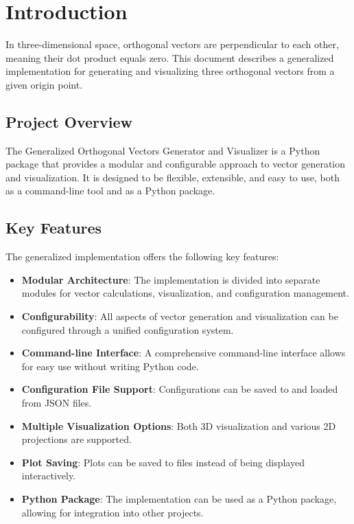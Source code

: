 \section{Introduction}

In three-dimensional space, orthogonal vectors are perpendicular to each other, meaning their dot product equals zero. This document describes a generalized implementation for generating and visualizing three orthogonal vectors from a given origin point.

\subsection{Project Overview}

The Generalized Orthogonal Vectors Generator and Visualizer is a Python package that provides a modular and configurable approach to vector generation and visualization. It is designed to be flexible, extensible, and easy to use, both as a command-line tool and as a Python package.

\subsection{Key Features}

The generalized implementation offers the following key features:

\begin{itemize}
    \item \textbf{Modular Architecture}: The implementation is divided into separate modules for vector calculations, visualization, and configuration management.
    
    \item \textbf{Configurability}: All aspects of vector generation and visualization can be configured through a unified configuration system.
    
    \item \textbf{Command-line Interface}: A comprehensive command-line interface allows for easy use without writing Python code.
    
    \item \textbf{Configuration File Support}: Configurations can be saved to and loaded from JSON files.
    
    \item \textbf{Multiple Visualization Options}: Both 3D visualization and various 2D projections are supported.
    
    \item \textbf{Plot Saving}: Plots can be saved to files instead of being displayed interactively.
    
    \item \textbf{Python Package}: The implementation can be used as a Python package, allowing for integration into other projects.
\end{itemize}


